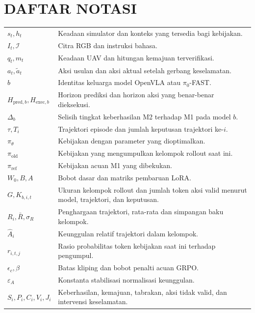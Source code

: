 \chapter*{DAFTAR NOTASI}
\begin{longtable}{p{2.5cm} p{\dimexpr\textwidth-2.5cm-4\tabcolsep\relax}}
$s_t,h_t$ & Keadaan simulator dan konteks yang tersedia bagi kebijakan. \\
$I_t,\mathcal I$ & Citra RGB dan instruksi bahasa. \\
$q_t,m_t$ & Keadaan UAV dan hitungan kemajuan terverifikasi. \\
$a_t,\tilde a_t$ & Aksi usulan dan aksi aktual setelah gerbang keselamatan. \\
$b$ & Identitas keluarga model OpenVLA atau $\pi_0$-FAST. \\
$H_{\mathrm{pred},b},H_{\mathrm{exec},b}$ & Horizon prediksi dan horizon aksi yang benar-benar dieksekusi. \\
$\Delta_b$ & Selisih tingkat keberhasilan M2 terhadap M1 pada model $b$. \\
$\tau,T_i$ & Trajektori episode dan jumlah keputusan trajektori ke-$i$. \\
$\pi_\theta$ & Kebijakan dengan parameter yang dioptimalkan. \\
$\pi_{\mathrm{old}}$ & Kebijakan yang mengumpulkan kelompok rollout saat ini. \\
$\pi_{\mathrm{ref}}$ & Kebijakan acuan M1 yang dibekukan. \\
$W_0,B,A$ & Bobot dasar dan matriks pembaruan LoRA. \\
$G,K_{b,i,t}$ & Ukuran kelompok rollout dan jumlah token aksi valid menurut model, trajektori, dan keputusan. \\
$R_i,\bar R,\sigma_R$ & Penghargaan trajektori, rata-rata dan simpangan baku kelompok. \\
$\hat A_i$ & Keunggulan relatif trajektori dalam kelompok. \\
$r_{i,t,j}$ & Rasio probabilitas token kebijakan saat ini terhadap pengumpul. \\
$\epsilon_c,\beta$ & Batas kliping dan bobot penalti acuan GRPO. \\
$\varepsilon_A$ & Konstanta stabilisasi normalisasi keunggulan. \\
$S_i,P_i,C_i,V_i,J_i$ & Keberhasilan, kemajuan, tabrakan, aksi tidak valid, dan intervensi keselamatan. \\
\end{longtable}
